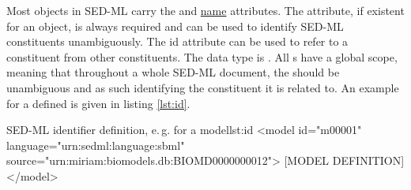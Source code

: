 \label{sec:id}
%

Most objects in SED-ML carry the  and \hyperref[sec:name]{name} attributes. 
The  attribute, if existent for an object, is always required and can be used to identify SED-ML constituents unambiguously.  The {id} attribute can be used to refer to a constituent from other constituents. 
The  data type is . All s have a global scope, meaning that throughout a whole SED-ML document, the  should be unambiguous and as such identifying the constituent it is related to.
An example for a defined  is given in listing \ref{lst:id}.
%
\begin{myXmlLst}{SED-ML identifier definition, e.\,g. for a model}{lst:id}
<model id="m00001" language="urn:sedml:language:sbml" source="urn:miriam:biomodels.db:BIOMD0000000012">
 [MODEL DEFINITION]
</model>
\end{myXmlLst}
%

